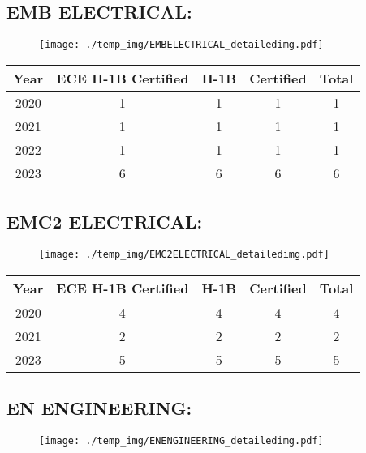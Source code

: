 \documentclass{article}%
\begin{document}
%
\newpage%
\subsection{EMB ELECTRICAL:}%
\label{subsec:EMBELECTRICAL}%
\label{EMBELECTRICALdetailed}%


\begin{figure}[htbp]%
\centering%
\texttt{[image: ./temp\_img/EMBELECTRICAL\_detailedimg.pdf]}%
\end{figure}

%
\begin{longtable}{c|c|c|c|c}%
\hline%
Year&ECE H{-}1B Certified&H{-}1B&Certified&Total\\%
\hline%
2020&1&1&1&1\\%
\hline%
2021&1&1&1&1\\%
\hline%
2022&1&1&1&1\\%
\hline%
2023&6&6&6&6\\%
\hline%
\end{longtable}

%
\newpage%
\subsection{EMC2 ELECTRICAL:}%
\label{subsec:EMC2ELECTRICAL}%
\label{EMC2ELECTRICALdetailed}%


\begin{figure}[htbp]%
\centering%
\texttt{[image: ./temp\_img/EMC2ELECTRICAL\_detailedimg.pdf]}%
\end{figure}

%
\begin{longtable}{c|c|c|c|c}%
\hline%
Year&ECE H{-}1B Certified&H{-}1B&Certified&Total\\%
\hline%
2020&4&4&4&4\\%
\hline%
2021&2&2&2&2\\%
\hline%
2023&5&5&5&5\\%
\hline%
\end{longtable}

%
\newpage%
\subsection{EN ENGINEERING:}%
\label{subsec:ENENGINEERING}%
\label{ENENGINEERINGdetailed}%


\begin{figure}[htbp]%
\centering%
\texttt{[image: ./temp\_img/ENENGINEERING\_detailedimg.pdf]}%
\end{figure}
\end{document}
